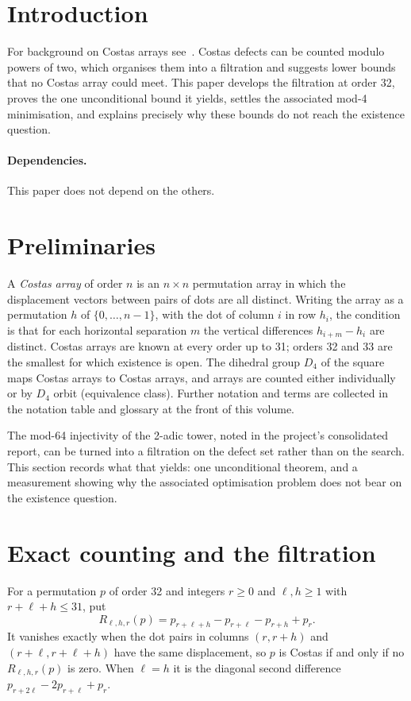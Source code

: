 \documentclass[11pt,a4paper,oneside]{report}
\theoremstyle{definition}
\begin{document}
\section{Introduction}\label{p7-sec:paperintro}
For background on Costas arrays see~\cite{p7-golombtaylor}. Costas defects can be counted modulo powers of two, which organises them into a filtration
and suggests lower bounds that no Costas array could meet. This paper develops the filtration at
order 32, proves the one unconditional bound it yields, settles the associated mod-4 minimisation,
and explains precisely why these bounds do not reach the existence question.

\paragraph{Dependencies.} This paper does not depend on the others.

\section{Preliminaries}\label{p7-sec:notation}
A \emph{Costas array} of order $n$ is an $n\times n$ permutation array in which the displacement
vectors between pairs of dots are all distinct. Writing the array as a permutation $h$ of
$\{0,\dots,n-1\}$, with the dot of column $i$ in row $h_i$, the condition is that for each
horizontal separation $m$ the vertical differences $h_{i+m}-h_i$ are distinct. Costas arrays are
known at every order up to 31; orders 32 and 33 are the smallest for which existence is open. The
dihedral group $D_4$ of the square maps Costas arrays to Costas arrays, and arrays are counted
either individually or by $D_4$ orbit (equivalence class). Further notation and terms are collected
in the notation table and glossary at the front of this volume.


The mod-64 injectivity of the 2-adic tower, noted in the project's consolidated report, can be turned into a
filtration on the defect set rather than on the search. This section records what
that yields: one unconditional theorem, and a measurement showing why the
associated optimisation problem does not bear on the existence question.

\section{Exact counting and the filtration}

For a permutation $p$ of order 32 and integers $r\ge0$ and $\ell,h\ge1$ with $r+\ell+h\le31$, put
\[
R_{\ell,h,r}(p)=p_{r+\ell+h}-p_{r+\ell}-p_{r+h}+p_r .
\]
It vanishes exactly when the dot pairs in columns $(r,r+h)$ and $(r+\ell,r+\ell+h)$ have the same
displacement, so $p$ is Costas if and only if no $R_{\ell,h,r}(p)$ is zero. When $\ell=h$ it is the
diagonal second difference $p_{r+2\ell}-2p_{r+\ell}+p_r$.
\end{document}
